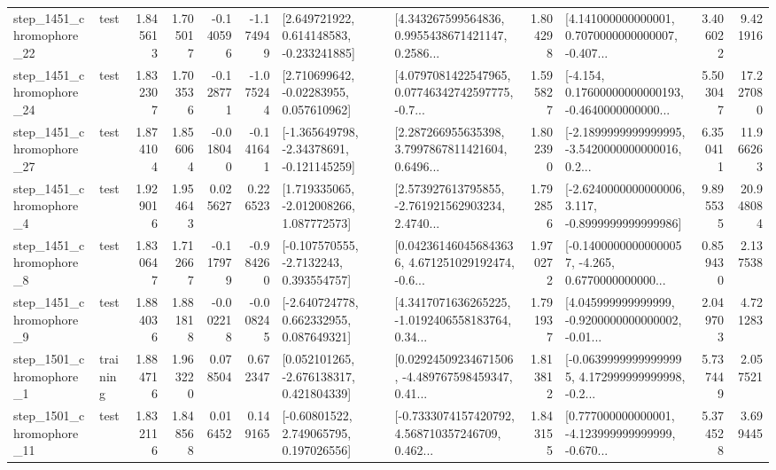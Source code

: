 \begin{tabular}{llrrrrllrlrr}
 step\_1451\_chromophore\_22 &      test &      1.845613 &    1.705017 &     -0.140596 & -1.174949 &    [2.649721922, 0.614148583, -0.233241885] &  [4.343267599564836, 0.9955438671421147, 0.2586... &       1.804298 &  [4.141000000000001, 0.7070000000000007, -0.407... &            3.406022 &          9.421916 \\
 step\_1451\_chromophore\_24 &      test &      1.832307 &    1.703536 &     -0.128771 & -1.075244 &     [2.710699642, -0.02283955, 0.057610962] &  [4.0797081422547965, 0.07746342742597775, -0.7... &       1.595827 &  [-4.154, 0.17600000000000193, -0.4640000000000... &            5.503047 &         17.227080 \\
 step\_1451\_chromophore\_27 &      test &      1.874104 &    1.856064 &     -0.018040 & -0.141641 &   [-1.365649798, -2.34378691, -0.121145259] &  [2.287266955635398, 3.7997867811421604, 0.6496... &       1.802390 &  [-2.1899999999999995, -3.5420000000000016, 0.2... &            6.350411 &         11.966263 \\
  step\_1451\_chromophore\_4 &      test &      1.929016 &    1.954643 &      0.025627 &  0.226523 &    [1.719335065, -2.012008266, 1.087772573] &  [2.573927613795855, -2.761921562903234, 2.4740... &       1.792856 &  [-2.6240000000000006, 3.117, -0.8999999999999986] &            9.895535 &         20.948084 \\
  step\_1451\_chromophore\_8 &      test &      1.830647 &    1.712667 &     -0.117979 & -0.984260 &     [-0.107570555, -2.7132243, 0.393554757] &  [0.042361460456843636, 4.671251029192474, -0.6... &       1.970272 &  [-0.14000000000000057, -4.265, 0.6770000000000... &            0.859430 &          2.137538 \\
  step\_1451\_chromophore\_9 &      test &      1.884036 &    1.881818 &     -0.002218 & -0.008245 &    [-2.640724778, 0.662332955, 0.087649321] &  [4.3417071636265225, -1.0192406558183764, 0.34... &       1.791937 &  [4.045999999999999, -0.9200000000000002, -0.01... &            2.049703 &          4.721283 \\
  step\_1501\_chromophore\_1 &  training &      1.884716 &    1.963220 &      0.078504 &  0.672347 &    [0.052101265, -2.676138317, 0.421804339] &  [0.02924509234671506, -4.489767598459347, 0.41... &       1.813812 &  [-0.06399999999999995, 4.172999999999998, -0.2... &            5.737449 &          2.057521 \\
 step\_1501\_chromophore\_11 &      test &      1.832116 &    1.848568 &      0.016452 &  0.149165 &     [-0.60801522, 2.749065795, 0.197026556] &  [-0.7333074157420792, 4.568710357246709, 0.462... &       1.843155 &  [0.777000000000001, -4.123999999999999, -0.670... &            5.374528 &          3.699445 \\

\end{tabular}

